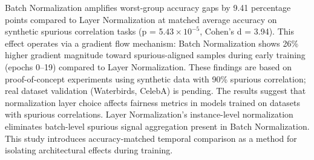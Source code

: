 
Batch Normalization amplifies worst-group accuracy gaps by 9.41 percentage points compared to Layer Normalization at matched average accuracy on synthetic spurious correlation tasks (p = 5.$43\times 10^{-5}$, Cohen's d = 3.94). This effect operates via a gradient flow mechanism: Batch Normalization shows 26\% higher gradient magnitude toward spurious-aligned samples during early training (epochs 0--19) compared to Layer Normalization. These findings are based on proof-of-concept experiments using synthetic data with 90\% spurious correlation; real dataset validation (Waterbirds, CelebA) is pending. The results suggest that normalization layer choice affects fairness metrics in models trained on datasets with spurious correlations. Layer Normalization's instance-level normalization eliminates batch-level spurious signal aggregation present in Batch Normalization. This study introduces accuracy-matched temporal comparison as a method for isolating architectural effects during training.
